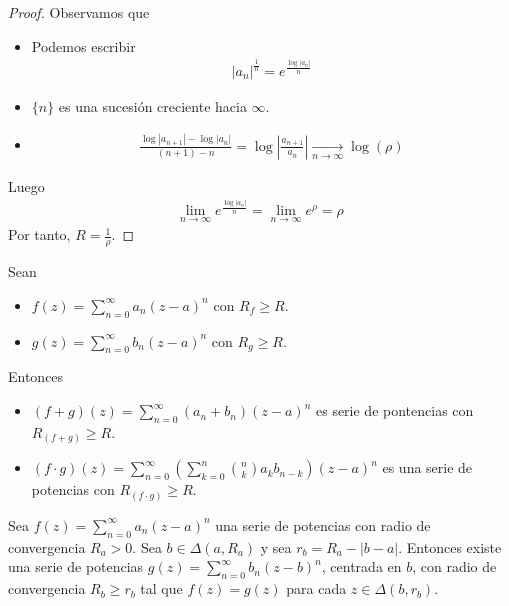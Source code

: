 \begin{obs}
\begin{enumerate}
    \begin{proof}
    Observamos que
    \begin{itemize}
        \item Podemos escribir
        \begin{align*}
            |a_n|^{\frac{1}{n}} = e^{\frac{\log|a_n|}{n}}  
        \end{align*}
        \item $\{n\}$ es una sucesión creciente hacia $\infty$.
        \item 
        \begin{align*}
            \frac{\log|a_{n+1}| - \log|a_n|}{(n+1) -n} = \log\left| \frac{a_{n+1}}{a_n} \right| \xrightarrow[n \to \infty]{} \log(\rho)
        \end{align*}
    \end{itemize}
    Luego
    \begin{align*}
        \lim_{n \to \infty}{e^{\frac{\log|a_n|}{n}}} = \lim_{n \to \infty}{e^{\rho}} = \rho
    \end{align*}
    Por tanto, $R = \frac{1}{\rho}$.
    \end{proof}
\end{enumerate}
\end{obs}

\begin{prop}
Sean
\begin{itemize}
    \item $f(z) = \sum_{n=0}^{\infty}{a_n(z - a)^n}$ con $R_f \ge R$.
    \item $g(z) = \sum_{n=0}^{\infty}{b_n(z - a)^n}$ con $R_g \ge R$.
\end{itemize}
Entonces
\begin{itemize}
    \item $(f + g)(z) = \sum_{n=0}^{\infty}{(a_n + b_n)(z - a)^n}$ es serie de pontencias con $R_{(f+g)} \ge R$.
    \item $(f \cdot g)(z) = \sum_{n=0}^{\infty}\left( \sum_{k=0}^{n} \binom{n}{k}a_kb_{n-k} \right)(z-a)^n$ es una serie de potencias con $R_{(f \cdot g)} \ge R$.
\end{itemize}
\end{prop}

\begin{prop}
Sea $f(z) = \sum_{n=0}^{\infty}{a_n(z - a)^n}$ una serie de potencias con radio de convergencia $R_a > 0$. Sea $b \in \Delta(a,R_a)$ y sea $r_b = R_a - |b-a|$. Entonces existe una serie de potencias $g(z) = \sum_{n=0}^{\infty}{b_n(z - b)^n}$, centrada en $b$, con radio de convergencia $R_b \ge r_b$ tal que $f(z) = g(z)$ para cada $z \in \Delta(b,r_b)$.
\end{prop}

